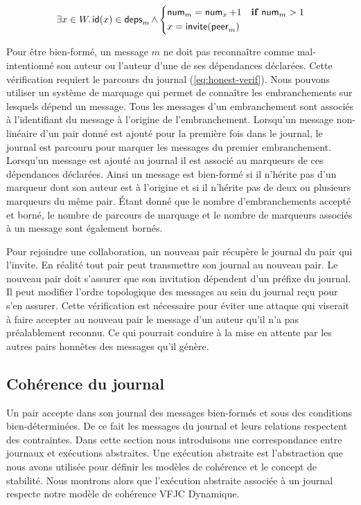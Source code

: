\begin{equation*}
    \exists x \in W \ldotp \operatorname{\mathsf{id}}(x) \in \operatorname{\mathsf{deps}}_m \land \begin{dcases}
    \operatorname{\mathsf{num}}_m = \operatorname{\mathsf{num}}_x + 1 & \mathrel{\mathbf{if}} \operatorname{\mathsf{num}}_m > 1\\
    x = \operatorname{\mathsf{invite}}(\operatorname{\mathsf{peer}}_m)
    \end{dcases}
\end{equation*}

Pour être bien-formé, un message $m$ ne doit pas reconnaître comme mal-intentionné son auteur ou l'auteur d'une de ses dépendances déclarées.
Cette vérification requiert le parcours du journal (\autoref{eq:honest-verif}).
Nous pouvons utiliser un système de marquage qui permet de connaître les embranchements sur lesquels dépend un message.
Tous les messages d'un embranchement sont associés à l'identifiant du message à l'origine de l'embranchement.
Lorsqu'un message non-linéaire d'un pair donné est ajouté pour la première fois dans le journal, le journal est parcouru pour marquer les messages du premier embranchement.
Lorsqu'un message est ajouté au journal il est associé au marqueurs de ces dépendances déclarées.
Ainsi un message est bien-formé si il n'hérite pas d'un marqueur dont son auteur est à l'origine et si il n'hérite pas de deux ou plusieurs marqueurs du même pair.
Étant donné que le nombre d'embranchements accepté et borné, le nombre de parcours de marquage et le nombre de marqueurs associés à un message sont également bornés.

Pour rejoindre une collaboration, un nouveau pair récupère le journal du pair qui l'invite.
En réalité tout pair peut transmettre son journal au nouveau pair.
Le nouveau pair doit s'assurer que son invitation dépendent d'un préfixe du journal.
Il peut modifier l'ordre topologique des messages au sein du journal reçu pour s'en assurer.
Cette vérification est nécessaire pour éviter une attaque qui viserait à faire accepter au nouveau pair le message d'un auteur qu'il n'a pas préalablement reconnu.
Ce qui pourrait conduire à la mise en attente par les autres pairs honnêtes des messages qu'il génère.


\subsection{Cohérence du journal}

Un pair accepte dans son journal des messages bien-formés et sous des conditions bien-déterminées.
De ce fait les messages du journal et leurs relations respectent des contraintes.
Dans cette section nous introduisons une correspondance entre journaux et exécutions abstraites.
Une exécution abstraite est l'abstraction que nous avons utilisée pour définir les modèles de cohérence et le concept de stabilité.
Nous montrons alors que l'exécution abstraite associée à un journal respecte notre modèle de cohérence \acl{VFJC} Dynamique.

